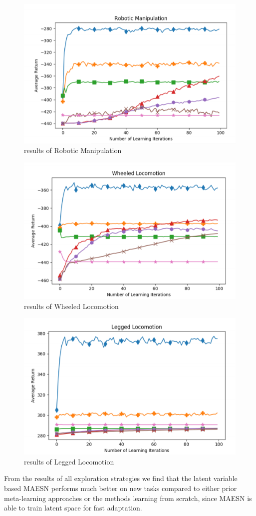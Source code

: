 \begin{figure}[H]
	\includegraphics[scale=0.5]{MAESN_09.PNG}
	\centering
	\caption{results of Robotic Manipulation}
	\label{MAESN}
\end{figure}
\begin{figure}[H]
	\includegraphics[scale=0.5]{MAESN_10.PNG}
	\centering
	\caption{results of Wheeled Locomotion}
	\label{MAESN}
\end{figure}
\begin{figure}[H]
	\includegraphics[scale=0.5]{MAESN_11.PNG}
	\centering
	\caption{results of Legged Locomotion}
	\label{MAESN}
\end{figure}
From the results of all exploration strategies we find that the latent variable based MAESN performs much better on new tasks compared to either prior meta-learning approaches or the methods learning from scratch, since MAESN is able to train latent space for fast adaptation.









